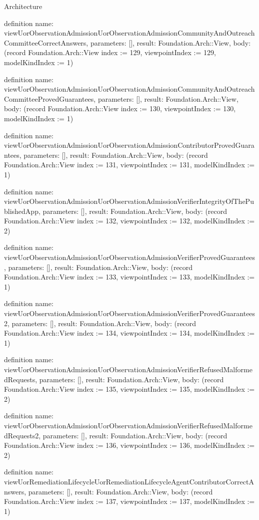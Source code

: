 \begin{lexlean}{Architecture}
\begin{semanticmodule}
definition{
  name: viewUorObservationAdmissionUorObservationAdmissionCommunityAndOutreachCommitteeCorrectAnswers,
  parameters: [],
  result: Foundation.Arch::View,
  body: (record Foundation.Arch::View {index := 129, viewpointIndex := 129, modelKindIndex := 1})
}

definition{
  name: viewUorObservationAdmissionUorObservationAdmissionCommunityAndOutreachCommitteeProvedGuarantees,
  parameters: [],
  result: Foundation.Arch::View,
  body: (record Foundation.Arch::View {index := 130, viewpointIndex := 130, modelKindIndex := 1})
}

definition{
  name: viewUorObservationAdmissionUorObservationAdmissionContributorProvedGuarantees,
  parameters: [],
  result: Foundation.Arch::View,
  body: (record Foundation.Arch::View {index := 131, viewpointIndex := 131, modelKindIndex := 1})
}

definition{
  name: viewUorObservationAdmissionUorObservationAdmissionVerifierIntegrityOfThePublishedApp,
  parameters: [],
  result: Foundation.Arch::View,
  body: (record Foundation.Arch::View {index := 132, viewpointIndex := 132, modelKindIndex := 2})
}

definition{
  name: viewUorObservationAdmissionUorObservationAdmissionVerifierProvedGuarantees,
  parameters: [],
  result: Foundation.Arch::View,
  body: (record Foundation.Arch::View {index := 133, viewpointIndex := 133, modelKindIndex := 1})
}

definition{
  name: viewUorObservationAdmissionUorObservationAdmissionVerifierProvedGuarantees2,
  parameters: [],
  result: Foundation.Arch::View,
  body: (record Foundation.Arch::View {index := 134, viewpointIndex := 134, modelKindIndex := 1})
}

definition{
  name: viewUorObservationAdmissionUorObservationAdmissionVerifierRefusedMalformedRequests,
  parameters: [],
  result: Foundation.Arch::View,
  body: (record Foundation.Arch::View {index := 135, viewpointIndex := 135, modelKindIndex := 2})
}

definition{
  name: viewUorObservationAdmissionUorObservationAdmissionVerifierRefusedMalformedRequests2,
  parameters: [],
  result: Foundation.Arch::View,
  body: (record Foundation.Arch::View {index := 136, viewpointIndex := 136, modelKindIndex := 2})
}

definition{
  name: viewUorRemediationLifecycleUorRemediationLifecycleAgentContributorCorrectAnswers,
  parameters: [],
  result: Foundation.Arch::View,
  body: (record Foundation.Arch::View {index := 137, viewpointIndex := 137, modelKindIndex := 1})
}


\end{semanticmodule}
\end{lexlean}

